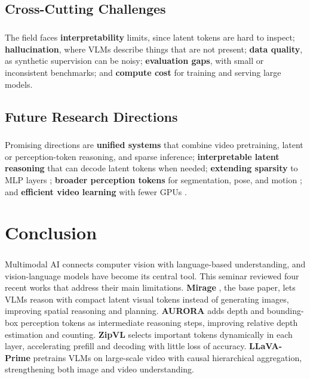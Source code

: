 \documentclass[12pt,a4paper,final]{extreport}
\begin{document}
\section{Cross-Cutting Challenges}

\paragraph{} The field faces \textbf{interpretability} limits, since latent tokens are hard to inspect; \textbf{hallucination}, where VLMs describe things that are not present; \textbf{data quality}, as synthetic supervision can be noisy; \textbf{evaluation gaps}, with small or inconsistent benchmarks; and \textbf{compute cost} for training and serving large models.

\section{Future Research Directions}

\paragraph{} Promising directions are \textbf{unified systems} that combine video pretraining, latent or perception-token reasoning, and sparse inference; \textbf{interpretable latent reasoning} that can decode latent tokens when needed; \textbf{extending sparsity} to MLP layers \cite{p3}; \textbf{broader perception tokens} for segmentation, pose, and motion \cite{p2}; and \textbf{efficient video learning} with fewer GPUs \cite{p4}.

\chapter{Conclusion}

\paragraph{} Multimodal AI connects computer vision with language-based understanding, and vision-language models have become its central tool. This seminar reviewed four recent works that address their main limitations. \textbf{Mirage} \cite{p1}, the base paper, lets VLMs reason with compact latent visual tokens instead of generating images, improving spatial reasoning and planning. \textbf{AURORA} \cite{p2} adds depth and bounding-box perception tokens as intermediate reasoning steps, improving relative depth estimation and counting. \textbf{ZipVL} \cite{p3} selects important tokens dynamically in each layer, accelerating prefill and decoding with little loss of accuracy. \textbf{LLaVA-Prime} \cite{p4} pretrains VLMs on large-scale video with causal hierarchical aggregation, strengthening both image and video understanding.
\end{document}
